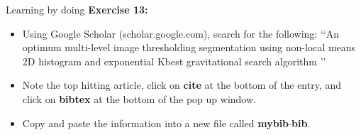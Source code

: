 \documentclass [9pt] {beamer}
\begin{document}
%
%
%
%


\begin{frame}{Learning by doing}
\textbf{Exercise 13:}
\begin{itemize}
	\item Using  Google Scholar (scholar.google.com), search for the following: \lq\lq An optimum multi-level image thresholding segmentation using non-local means 2D histogram and exponential Kbest gravitational search algorithm \rq\rq
	\item Note the top hitting article, click on \textbf{cite} at the bottom of the entry, and click on \textbf{bibtex} at the bottom of the pop up window.
	\item Copy and paste the information into a new file called \textbf{mybib$\cdot$bib}.
\end{itemize}

\end{frame}
\end{document}
